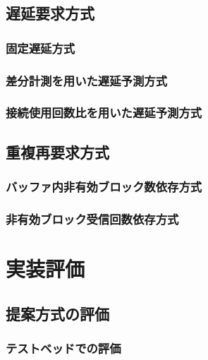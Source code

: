 \documentclass[a4j,12pt]{gradthesis_utf8}
\begin{document}
\section{遅延要求方式}
\subsection{固定遅延方式}

\subsection{差分計測を用いた遅延予測方式}

\subsection{接続使用回数比を用いた遅延予測方式}

\section{重複再要求方式}
\subsection{バッファ内非有効ブロック数依存方式}
\subsection{非有効ブロック受信回数依存方式}

\chapter{実装評価}\label{sec:sec4}

\section{提案方式の評価}
\subsection{テストベッドでの評価}
\end{document}

